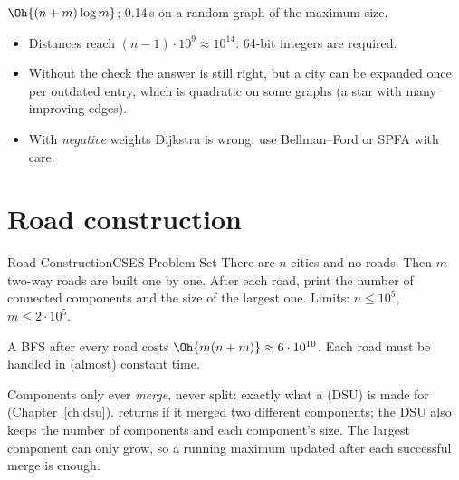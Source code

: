  $\Oh{(n + m)\log m}$; 0.14\,s on a random graph of the maximum size.

\begin{pitfall}
\begin{itemize}
  \item Distances reach $(n-1)\cdot10^9 \approx 10^{14}$: 64-bit integers are required.
  \item Without the  check the answer is still right, but a city can be expanded once per outdated entry,
        which is quadratic on some graphs (a star with many improving edges).
  \item With \emph{negative} weights Dijkstra is wrong; use Bellman--Ford or SPFA with care.
\end{itemize}
\end{pitfall}

\section[Road construction]{Road construction \hfill \gold}\label{wp:roads}

\begin{statement}{Road Construction}{CSES Problem Set}
There are $n$ cities and no roads. Then $m$ two-way roads are built one by one. After each road, print the number of
connected components and the size of the largest one. Limits: $n \le 10^5$, $m \le 2\cdot10^5$.
\end{statement}

 A BFS after every road costs $\Oh{m(n+m)} \approx 6\cdot10^{10}$. Each road must be handled in
(almost) constant time.

 Components only ever \emph{merge}, never split: exactly what a  (DSU) is made
for (Chapter~\ref{ch:dsu}).  returns  if it merged two different components; the DSU also keeps
the number of components and each component's size. The largest component can only grow, so a running maximum updated after
each successful merge is enough.


